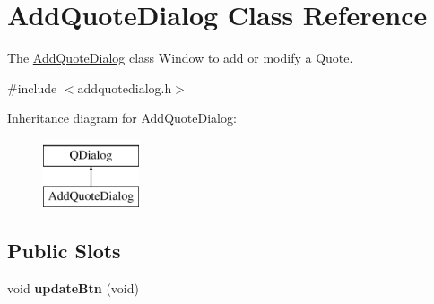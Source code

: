 \hypertarget{classAddQuoteDialog}{\section{Add\+Quote\+Dialog Class Reference}
\label{classAddQuoteDialog}
}


The \hyperlink{classAddQuoteDialog}{Add\+Quote\+Dialog} class Window to add or modify a Quote.  




{\ttfamily \#include $<$addquotedialog.\+h$>$}

Inheritance diagram for Add\+Quote\+Dialog\+:\begin{figure}[H]
\begin{center}
\leavevmode
\includegraphics[height=2.000000cm]{d6/dd0/classAddQuoteDialog}
\end{center}
\end{figure}
\subsection*{Public Slots}
\begin{DoxyCompactItemize}
\item 
\hypertarget{classAddQuoteDialog_a13ac42422b64af47d97a8faa9bff0d3f}{void {\bfseries update\+Btn} (void)}\label{classAddQuoteDialog_a13ac42422b64af47d97a8faa9bff0d3f}

\end{DoxyCompactItemize}
